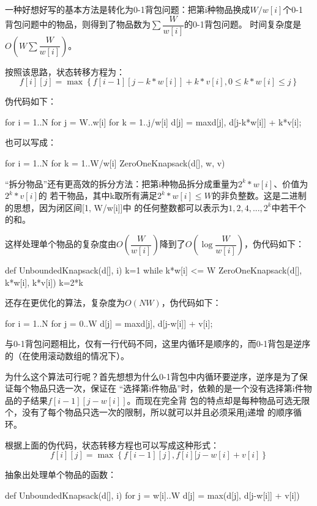 一种好想好写的基本方法是转化为0-1背包问题：把第i种物品换成$W/w[i]$个0-1
背包问题中的物品，则得到了物品数为$\sum \dfrac{W}{w[i]}$的0-1背包问题。
时间复杂度是$O(W\sum \dfrac{W}{w[i]})$。

按照该思路，状态转移方程为：
$$f[i][j]=\max\left\{f[i-1][j-k*w[i]]+k*v[i], 0 \leq k*w[i] \leq j\right\}$$

伪代码如下：
\begin{Code}
for i = 1..N
    for j = W..w[i]
        for k = 1..j/w[i]
            d[j] = max{d[j], d[j-k*w[i]] + k*v[i]};
\end{Code}

也可以写成：
\begin{Code}
for i = 1..N
    for k = 1..W/w[i]
        ZeroOneKnapsack(d[], w, v)
\end{Code}

“拆分物品”还有更高效的拆分方法：把第i种物品拆分成重量为$2^k*w[i]$、价值为$2^k*v[i]$的
若干物品，其中k取所有满足$2^k*w[i] \leq W$的非负整数。这是二进制的思想，因为闭区间[1, W/w[i]]中
的任何整数都可以表示为$1, 2, 4, ..., 2^k$中若干个的和。

这样处理单个物品的复杂度由$O\left(\dfrac{W}{w[i]}\right)$降到了$O\left(\log \dfrac{W}{w[i]}\right)$，伪代码如下：
\begin{Code}
def UnboundedKnapsack(d[], i)
    k=1
    while k*w[i] <= W
        ZeroOneKnapsack(d[], k*w[i], k*v[i])
        k=2*k
\end{Code}

还存在更优化的算法，复杂度为$O(NW)$，伪代码如下：
\begin{Code}
for i = 1..N
    for j = 0..W
        d[j] = max{d[j], d[j-w[i]] + v[i]};
\end{Code}

与0-1背包问题相比，仅有一行代码不同，这里内循环是顺序的，而0-1背包是逆序的（在使用滚动数组的情况下）。

为什么这个算法可行呢？首先想想为什么0-1背包中内循环要逆序，逆序是为了保证每个物品只选一次，保证在
“选择第i件物品”时，依赖的是一个没有选择第i件物品的子结果$f[i-1][j-w[i]]$。而现在完全背
包的特点却是每种物品可选无限个，没有了每个物品只选一次的限制，所以就可以并且必须采用j递增
的顺序循环。

根据上面的伪代码，状态转移方程也可以写成这种形式：
$$f[i][j]=\max\left\{f[i-1][j], f[i][j-w[i]+v[i]\right\}$$

抽象出处理单个物品的函数：
\begin{Code}
def UnboundedKnapsack(d[], i)
    for j = w[i]..W
        d[j] = max(d[j], d[j-w[i]] + v[i])
\end{Code}

